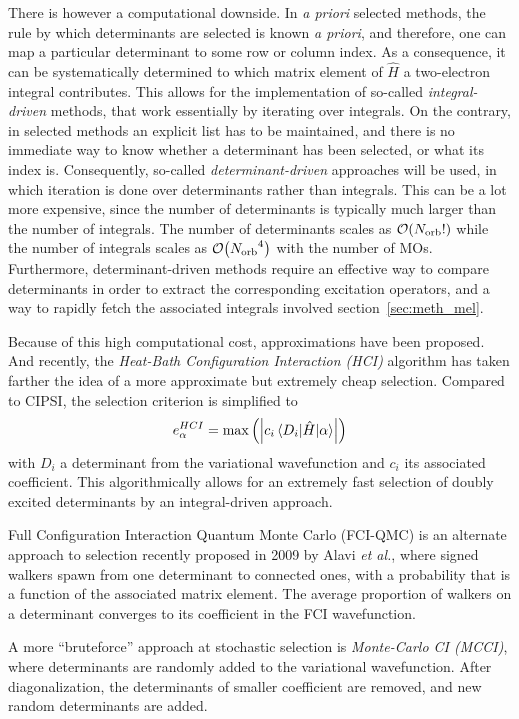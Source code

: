 \documentclass[./thesis.tex]{subfiles}
\begin{document}
There is however a computational downside. In \textit{a priori} selected methods, the rule by which determinants are selected is known \textit{a priori}, and therefore, one can map a particular determinant to some row or column index.\cite{Knowles_1984} As a consequence, it can be systematically determined to which matrix element of $\widehat{H}$ a two-electron integral contributes. This allows for the implementation of so-called \emph{integral-driven} methods, that work essentially by iterating over integrals.
On the contrary, in selected methods an explicit list has to be maintained, and there is no immediate way to know whether a determinant has been selected, or what its index is. Consequently, so-called \emph{determinant-driven} approaches will be used, in which iteration is done over determinants rather than integrals. This can be a lot more expensive, since the number of determinants is typically much larger than the number of integrals. The number of determinants scales as $\order{\Norb!}$ while the number of integrals scales as $\order{\Norb^4}$ with the number of MOs.
Furthermore, determinant-driven methods require an effective way to compare determinants in order to extract the corresponding excitation operators, and a way to rapidly fetch the associated integrals involved section~\ref{sec:meth_mel}.

Because of this high computational cost, approximations have been proposed.\cite{Evangelisti_1983} And recently, the \emph{Heat-Bath Configuration Interaction (HCI)} algorithm has taken farther the idea of a more approximate but extremely cheap selection.\cite{Holmes_2016, Sharma_2017} Compared to CIPSI, the selection criterion is simplified to
\begin{equation}
e^{HCI}_\alpha = \max \qty( \qty| c_i \mel{D_i}{\hat{H}}{\alpha} | )
\end{equation}
with $D_i$ a determinant from the variational wavefunction and $c_i$ its associated coefficient. This algorithmically allows for an extremely fast selection of doubly
excited determinants by an integral-driven approach.

Full Configuration Interaction Quantum Monte Carlo (FCI-QMC) is an alternate approach to selection recently proposed in 2009 by Alavi \textit{et al.},\cite{Booth_2009,Booth_2010,Cleland_2010} where signed walkers spawn from one determinant to connected ones, with a probability that is a function of the associated matrix element. The average proportion of walkers on a determinant converges to its coefficient in the FCI wavefunction.

A more ``bruteforce'' approach at stochastic selection is \emph{Monte-Carlo CI (MCCI)},\cite{Greer_1995,Greer_1998} where determinants are randomly added to the variational wavefunction. After diagonalization, the determinants of smaller coefficient are removed, and new random determinants are added.
\end{document}
